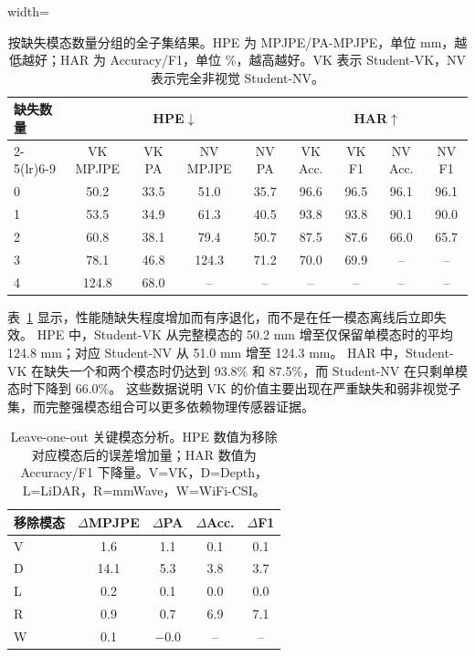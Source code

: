 \documentclass[journal]{IEEEtran}
\begin{document}
\begin{table}[H]
\centering
\caption{按缺失模态数量分组的全子集结果。HPE 为 MPJPE/PA-MPJPE，单位 mm，越低越好；HAR 为 Accuracy/F1，单位 \%，越高越好。VK 表示 Student-VK，NV 表示完全非视觉 Student-NV。}
\label{tab:severity_add}
\scriptsize
\begin{adjustbox}{width=\columnwidth}
\begin{tabular}{lcccccccc}
\toprule
\multirow{2}{*}{缺失数量} & \multicolumn{4}{c}{HPE$\downarrow$} & \multicolumn{4}{c}{HAR$\uparrow$} \\
\cmidrule(lr){2-5}\cmidrule(lr){6-9}
 & VK MPJPE & VK PA & NV MPJPE & NV PA & VK Acc. & VK F1 & NV Acc. & NV F1 \\
\midrule
0 & 50.2 & 33.5 & 51.0 & 35.7 & 96.6 & 96.5 & 96.1 & 96.1 \\
1 & 53.5 & 34.9 & 61.3 & 40.5 & 93.8 & 93.8 & 90.1 & 90.0 \\
2 & 60.8 & 38.1 & 79.4 & 50.7 & 87.5 & 87.6 & 66.0 & 65.7 \\
3 & 78.1 & 46.8 & 124.3 & 71.2 & 70.0 & 69.9 & -- & -- \\
4 & 124.8 & 68.0 & -- & -- & -- & -- & -- & -- \\
\bottomrule
\end{tabular}
\end{adjustbox}
\end{table}

表~\ref{tab:severity_add} 显示，性能随缺失程度增加而有序退化，而不是在任一模态离线后立即失效。
HPE 中，Student-VK 从完整模态的 50.2 mm 增至仅保留单模态时的平均 124.8 mm；对应 Student-NV 从 51.0 mm 增至 124.3 mm。
HAR 中，Student-VK 在缺失一个和两个模态时仍达到 93.8\% 和 87.5\%，而 Student-NV 在只剩单模态时下降到 66.0\%。
这些数据说明 VK 的价值主要出现在严重缺失和弱非视觉子集，而完整强模态组合可以更多依赖物理传感器证据。

\begin{table}[H]
\centering
\caption{Leave-one-out 关键模态分析。HPE 数值为移除对应模态后的误差增加量；HAR 数值为 Accuracy/F1 下降量。V=VK，D=Depth，L=LiDAR，R=mmWave，W=WiFi-CSI。}
\label{tab:loo_add}
\footnotesize
\begin{tabular}{lcccc}
\toprule
移除模态 & $\Delta$MPJPE & $\Delta$PA & $\Delta$Acc. & $\Delta$F1 \\
\midrule
V & 1.6 & 1.1 & 0.1 & 0.1 \\
D & 14.1 & 5.3 & 3.8 & 3.7 \\
L & 0.2 & 0.1 & 0.0 & 0.0 \\
R & 0.9 & 0.7 & 6.9 & 7.1 \\
W & 0.1 & $-0.0$ & -- & -- \\
\bottomrule
\end{tabular}
\end{table}
\end{document}
